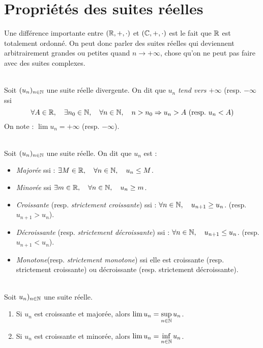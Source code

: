 \section{Propriétés des suites réelles}
    Une différence importante entre \((\mathbb{R}, +, \cdot)\) et \((\mathbb{C}, +, \cdot)\) est le fait que \(\mathbb{R}\) est totalement ordonné.
    On peut donc parler des suites réelles qui deviennent arbitrairement grandes ou petites quand \(n\to+\infty\), chose qu'on ne peut pas faire avec des suites complexes.

    \begin{definition}
        \ \\
        Soit \((u_n)_{n\in\mathbb{N}}\) une suite réelle divergente. On dit que \(u_n\) \emph{tend vers \(+\infty\)} (resp. \(-\infty\)  ssi 
        \[
            \forall A \in \mathbb{R}, \quad \exists n_0 \in \mathbb{N}, \quad \forall n \in \mathbb{N}, \quad n > n_0 \Rightarrow u_n > A\ \mathrm{(resp.}\ u_n < A)     
        \]  
        On note :  \(\lim u_n = +\infty\) (resp. \(-\infty\)).
    \end{definition}

    \begin{definition}\ \\
        Soit \((u_n)_{n\in\mathbb{N}}\) une suite réelle.
        On dit que \(u_n\) est :
        \begin{itemize}
            \item\emph{Majorée} ssi : \(\exists M \in \mathbb{R}, \quad \forall n \in \mathbb{N}, \quad u_n \le M\).
            \item\emph{Minorée} ssi \(\exists m \in \mathbb{R}, \quad \forall n \in \mathbb{N}, \quad u_n \ge m\).
            \item\emph{Croissante} (resp. \emph{strictement croissante}) ssi : \(\forall n\in \mathbb{N}, \quad u_{n+1} \ge u_n\). (resp. \(u_{n+1} > u_n\)).
            \item\emph{Décroissante} (resp. \emph{strictement décroissante}) ssi : \(\forall n\in \mathbb{N}, \quad u_{n+1} \le u_n\). (resp. \(u_{n+1} < u_n\)).
            \item\emph{Monotone}(resp. \emph{strictement monotone}) ssi elle est croissante (resp. strictement croissante) ou décroissante (resp. strictement décroissante).
        \end{itemize}
    \end{definition}


    \begin{theorem}\ \\
        \label{thm:suites_monotone}
        Soit \(u_n)_{n\in\mathbb{N}}\) une suite réelle. 
        \begin{enumerate}[label=(\roman*)]
            \item Si \(u_n\) est croissante et majorée, alors \(\lim u_n = \sup\limits_{n\in\mathbb{N}}u_n\).
            \item Si \(u_n\) est croissante et minorée, alors \(\lim u_n = \inf\limits_{n\in\mathbb{N}}u_n\).
        \end{enumerate}
    \end{theorem}

